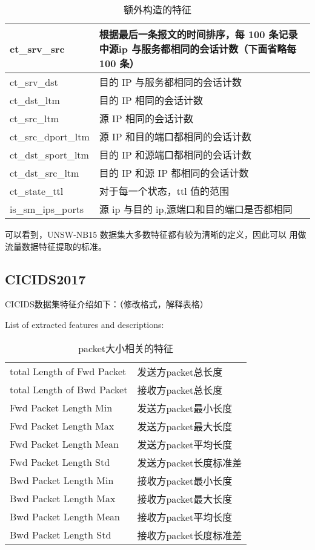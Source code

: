 \begin{table}[H]
    \caption{额外构造的特征}
    \centering
    \begin{tabular}{|l|p{}<{\centering}|}
    \hline
    ct\_srv\_src                & 根据最后一条报文的时间排序，每 100 条记录中源ip 与服务都相同的会话计数（下面省略每 100 条）  \\ \hline
    ct\_srv\_dst                & 目的 IP 与服务都相同的会话计数         \\ \hline
    ct\_dst\_ltm                & 目的 IP 相同的会话计数             \\ \hline
    ct\_src\_ltm                & 源 IP 相同的会话计数              \\ \hline
    ct\_src\_dport\_ltm         & 源 IP 和目的端口都相同的会话计数        \\ \hline
    ct\_dst\_sport\_ltm         & 目的 IP 和源端口都相同的会话计数        \\ \hline
    ct\_dst\_src\_ltm           & 目的 IP 和源 IP 都相同的会话计数      \\ \hline
    ct\_state\_ttl              & 对于每一个状态，ttl 值的范围          \\ \hline
    is\_sm\_ips\_ports          & 源 ip 与目的 ip,源端口和目的端口是否都相同 \\ \hline
    \end{tabular}
    \end{table}
 
可以看到，UNSW-NB15 数据集大多数特征都有较为清晰的定义，因此可以
用做流量数据特征提取的标准。 

\subsection{CICIDS2017}
CICIDS数据集特征介绍如下：（修改格式，解释表格）


List of extracted features and descriptions: \\


\begin{table}[H]
    \caption{packet大小相关的特征}
    \centering
    \begin{tabular}{|l|l|}
    \hline
    total Length of Fwd Packet	& 发送方packet总长度 \\
    total Length of Bwd Packet	& 接收方packet总长度 \\
    Fwd Packet Length Min 		& 发送方packet最小长度 \\
    Fwd Packet Length Max 		& 发送方packet最大长度 \\
    Fwd Packet Length Mean		& 发送方packet平均长度 \\
    Fwd Packet Length Std		& 发送方packet长度标准差 \\
    Bwd Packet Length Min		& 接收方packet最小长度 \\
    Bwd Packet Length Max		& 接收方packet最大长度 \\
    Bwd Packet Length Mean		& 接收方packet平均长度 \\
    Bwd Packet Length Std		& 接收方packet长度标准差 \\
    \hline
    \end{tabular}
    \end{table}

